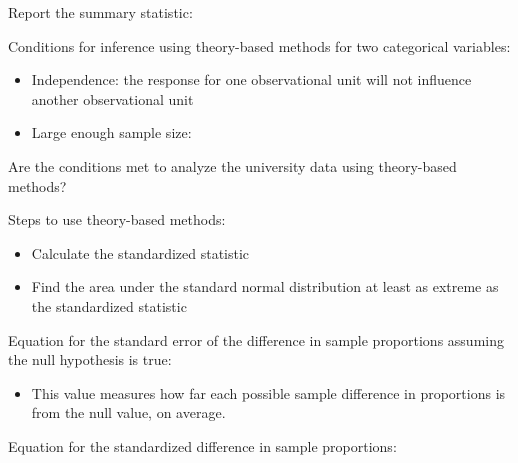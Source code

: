 \documentclass[
]{report}
\providecommand{\tightlist}{%
  \setlength{\itemsep}{0pt}\setlength{\parskip}{0pt}}
\begin{document}
Report the summary statistic:

\vspace{0.6in}

Conditions for inference using theory-based methods for two categorical variables:

\begin{itemize}
\tightlist
\item
  Independence: the response for one observational unit will not influence another observational unit
\end{itemize}

\vspace{0.2in}

\begin{itemize}
\tightlist
\item
  Large enough sample size:
\end{itemize}

\vspace{0.7in}

Are the conditions met to analyze the university data using theory-based methods?

\vspace{0.8in}
\newpage

Steps to use theory-based methods:

\begin{itemize}
\item
  Calculate the standardized statistic
\item
  Find the area under the standard normal distribution at least as extreme as the standardized statistic
\end{itemize}

Equation for the standard error of the difference in sample proportions assuming the null hypothesis is true:

\vspace{0.8in}


\begin{itemize}
\tightlist
\item
  This value measures how far each possible sample difference in proportions is from the null value, on average.
\end{itemize}


Equation for the standardized difference in sample proportions:

\vspace{0.8in}
\end{document}

